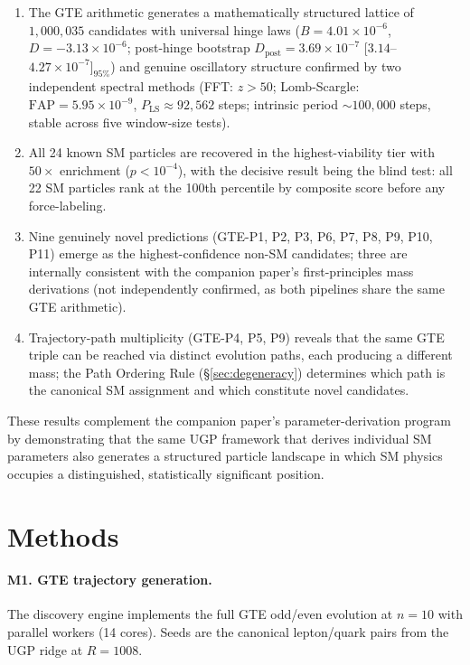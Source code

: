 \documentclass[12pt]{article}
\numberwithin{equation}{section}
\begin{document}
\begin{enumerate}[nosep]
\item The GTE arithmetic generates a mathematically structured lattice of $1{,}000{,}035$ candidates with universal hinge laws ($B = 4.01 \times 10^{-6}$, $D = -3.13 \times 10^{-6}$; post-hinge bootstrap $D_{\text{post}} = 3.69 \times 10^{-7}$ [$3.14$--$4.27 \times 10^{-7}]_{95\%}$) and genuine oscillatory structure confirmed by two independent spectral methods (FFT: $z > 50$; Lomb-Scargle: $\mathrm{FAP} = 5.95 \times 10^{-9}$, $P_{\text{LS}} \approx 92{,}562$ steps; intrinsic period ${\sim}100{,}000$ steps, stable across five window-size tests).
\item All 24 known SM particles are recovered in the highest-viability tier with $50\times$ enrichment ($p < 10^{-4}$), with the decisive result being the blind test: all 22 SM particles rank at the 100th percentile by composite score before any force-labeling.
\item Nine genuinely novel predictions (GTE-P1, P2, P3, P6, P7, P8, P9, P10, P11) emerge as the highest-confidence non-SM candidates; three are internally consistent with the companion paper's first-principles mass derivations (not independently confirmed, as both pipelines share the same GTE arithmetic).
\item Trajectory-path multiplicity (GTE-P4, P5, P9) reveals that the same GTE triple can be reached via distinct evolution paths, each producing a different mass; the Path Ordering Rule (\S\ref{sec:degeneracy}) determines which path is the canonical SM assignment and which constitute novel candidates.
\end{enumerate}

These results complement the companion paper's parameter-derivation program~\cite{SpivackSM} by demonstrating that the same UGP framework that derives individual SM parameters also generates a structured particle landscape in which SM physics occupies a distinguished, statistically significant position.

\section*{Methods}

\paragraph{M1. GTE trajectory generation.}
The discovery engine implements the full GTE odd/even evolution at $n{=}10$ with parallel workers (14 cores). Seeds are the canonical lepton/quark pairs from the UGP ridge at $R = 1008$.
\end{document}
